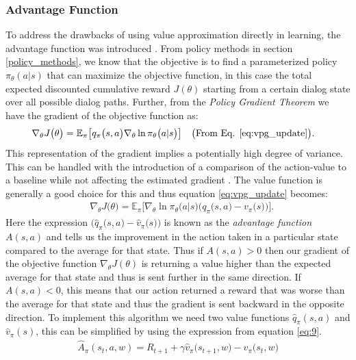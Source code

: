 \documentclass[12pt]{extarticle}
\numberwithin{equation}{section}
\begin{document}
	\subsubsection{Advantage Function}
	To address the drawbacks of using value approximation directly in learning, the advantage function was introduced \cite{Sutton_pg}. From policy methods in section \ref{policy_methods}, we know that the objective is to find a parameterized policy $\pi_{\theta}(a|s)$ that can maximize the objective function, in this case the total expected discounted cumulative reward $J(\theta)$ starting from a certain dialog state over all possible dialog paths. Further, from the \textit{Policy Gradient Theorem}\cite{Sutton-introRL} we have the gradient of the objective function as:
	\begin{align}
	& \nabla_{\theta}J\big(\theta\big) = \mathbb{E}_{\pi}\big[q_{\pi}\big(s,a\big)\nabla_{\theta}\ln\pi_{\theta}\big(a|s\big)\big]\nonumber &&\big(\text{From Eq. \ref{eq:vpg_update}}\big) .
	\end{align}
	This representation of the gradient implies a potentially high degree of variance. This can be handled with the introduction of a comparison of the action-value to a baseline while not affecting the estimated gradient \cite{Sutton-introRL}. The value function is generally a good choice for this and thus equation \ref{eq:vpg_update} becomes: 
	\begin{align}
	& \nabla_{\theta}J\big(\theta\big) = \mathbb{E}_{\pi}\big[\nabla_{\theta}\ln\pi_{\theta}\big(a|s\big)\big(q_{\pi}\big(s,a\big) - v_{\pi}\big(s\big) \big)\big].\label{eq:baseline}
	\end{align}
	Here the expression $\big(\hat{q}_{\pi}\big(s,a\big) - \hat{v}_{\pi}\big(s\big) \big)$ is known as the \textit{advantage function} $A(s,a)$ and tells us the improvement in the action taken in a particular state compared to the average for that state. Thus if $A(s,a) > 0$ then our gradient of the objective function $\nabla_{\theta}J(\theta)$ is returning a value higher than the expected average for that state and thus is sent further in the same direction. If $A(s,a) < 0$, this means that our action returned a reward that was worse than the average for that state and thus the gradient is sent backward in the opposite direction. To implement this algorithm we need two value functions $\hat{q}_{\pi}(s,a)$ and $\hat{v}_{\pi}(s)$, this can be simplified by using the expression from equation \ref{eq:9}.
	\begin{align}
	\hat{A}_{\pi}(s_t,a,w)  = R_{t+1} + \gamma \hat{v}_{\pi}\big(s_{t+1},w\big) - \hat{v}_{\pi}\big(s_t,w\big) \label{eq:adv}
	\end{align}
\end{document}
